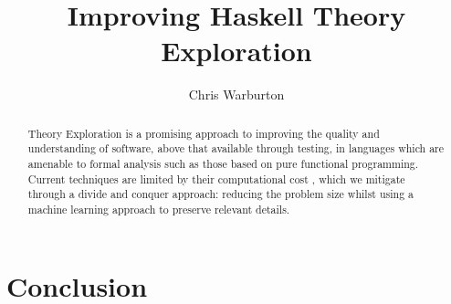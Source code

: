 \documentclass[]{article}
\begin{document}
\pagestyle{headings}  %

\title{Improving Haskell Theory Exploration}

\author{Chris Warburton}


\maketitle              %

\begin{abstract}
Theory Exploration is a promising approach to improving the quality and understanding of software, above that available through testing, in languages which are amenable to formal analysis such as those based on pure functional programming. Current techniques \iffalse TODO: it sounds as if you are talking about techniques of "formal analysis" here rather than techniques of TE. Reformulate. \fi are limited by their computational cost \iffalse TODO: Unclear what that means in this context. Computations of what is costly? why? same for "problem size" below \fi, which we mitigate through a divide and conquer approach: reducing the problem size whilst using a machine learning approach to preserve relevant details.
\end{abstract}






\iffalse
\section{First Results}

TODO

Future work?
Hypothetical use cases?
\fi




\iffalse TODO: Section that brings back ML discussion to TE is missing \fi

\section{Conclusion}
\label{sec:conclusion}



\end{document}
